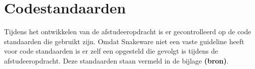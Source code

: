 \section{Codestandaarden}
Tijdens het ontwikkelen van de afstudeeropdracht is er gecontrolleerd op de code standaarden die gebruikt zijn.
Omdat Snakeware niet een vaste guideline heeft voor code standaarden is er zelf een opgesteld die gevolgt is tijdens de afstudeeropdracht.
Deze standaarden staan vermeld in de bijlage \textbf{(bron)}.
